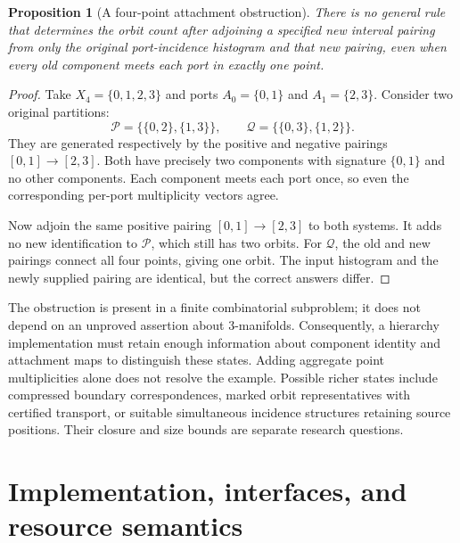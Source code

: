 \documentclass[11pt,letterpaper]{article}
\newtheorem{proposition}[theorem]{Proposition}
\theoremstyle{definition}
\begin{document}
\begin{proposition}[A four-point attachment obstruction]\label{prop:barrier}
There is no general rule that determines the orbit count after adjoining a
specified new interval pairing from only the original port-incidence
histogram and that new pairing, even when every old component meets each
port in exactly one point.
\end{proposition}
\begin{proof}
Take $X_4=\{0,1,2,3\}$ and ports
$A_0=\{0,1\}$ and $A_1=\{2,3\}$. Consider two original partitions:
\[
 \mathcal P=\{\{0,2\},\{1,3\}\},\qquad
 \mathcal Q=\{\{0,3\},\{1,2\}\}.
\]
They are generated respectively by the positive and negative pairings
$[0,1]\to[2,3]$. Both have precisely two components with signature
$\{0,1\}$ and no other components. Each component meets each port once,
so even the corresponding per-port multiplicity vectors agree.

Now adjoin the same positive pairing $[0,1]\to[2,3]$ to both systems. It
adds no new identification to $\mathcal P$, which still has two orbits.
For $\mathcal Q$, the old and new pairings connect all four points, giving
one orbit. The input histogram and the newly supplied pairing are
identical, but the correct answers differ.
\end{proof}

The obstruction is present in a finite combinatorial subproblem; it does
not depend on an unproved assertion about 3-manifolds. Consequently, a
hierarchy implementation must retain enough information about component
identity and attachment maps to distinguish these states. Adding aggregate
point multiplicities alone does not resolve the example. Possible richer
states include compressed boundary correspondences, marked orbit
representatives with certified transport, or suitable simultaneous
incidence structures retaining source positions. Their closure and size
bounds are separate research questions.

\section{Implementation, interfaces, and resource semantics}\label{sec:implementation}
\end{document}
